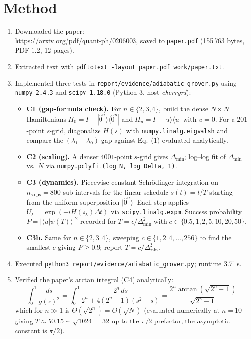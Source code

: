 \documentclass[11pt]{article}
\begin{document}
\section{Method}
\begin{enumerate}
\item Downloaded the paper: \\
\url{https://arxiv.org/pdf/quant-ph/0206003}, saved to \texttt{paper.pdf}
(155\,763 bytes, PDF 1.2, 12 pages).
\item Extracted text with \verb|pdftotext -layout paper.pdf work/paper.txt|.
\item Implemented three tests in
\texttt{report/evidence/adiabatic\_grover.py} using
\texttt{numpy 2.4.3} and \texttt{scipy 1.18.0} (Python 3, host \emph{cherryrd}):
\begin{itemize}
\item {\bf C1 (gap-formula check).} For $n \in \{2,3,4\}$, build the dense
$N\times N$ Hamiltonians $H_0 = I - |\hat 0^n\rangle\langle \hat 0^n|$ and
$H_u = I - |u\rangle\langle u|$ with $u=0$. For a $201$-point $s$-grid,
diagonalize $H(s)$ with \texttt{numpy.linalg.eigvalsh} and compare the
$(\lambda_1 - \lambda_0)$ gap against Eq.~(1) evaluated analytically.
\item {\bf C2 (scaling).} A denser $4001$-point $s$-grid gives
$\Delta_{\min}$; log--log fit of $\Delta_{\min}$ vs.\ $N$ via
\texttt{numpy.polyfit(log N, log Delta, 1)}.
\item {\bf C3 (dynamics).} Piecewise-constant Schr\"odinger integration on
$n_{\mathrm{steps}}=800$ sub-intervals for the linear schedule $s(t)=t/T$
starting from the uniform superposition
$|\hat 0^n\rangle$. Each step applies
$U_k = \exp(-i H(s_k) \Delta t)$ via \texttt{scipy.linalg.expm}.
Success probability $P = |\langle u|\psi(T)\rangle|^2$ recorded for
$T = c/\Delta_{\min}^2$ with $c \in \{0.5,1,2,5,10,20,50\}$.
\item {\bf C3b.} Same for $n \in \{2,3,4\}$, sweeping $c \in \{1,2,4,\dots,256\}$
to find the smallest $c$ giving $P \ge 0.9$; report $T = c/\Delta_{\min}^2$.
\end{itemize}
\item Executed
\verb|python3 report/evidence/adiabatic_grover.py|; runtime 3.71\,s.
\item Verified the paper's arctan integral (C4) analytically:
\[
\int_0^1 \frac{ds}{g(s)^2} = \int_0^1 \frac{2^n\,ds}{2^n + 4(2^n-1)(s^2-s)}
    = \frac{2^n \arctan(\sqrt{2^n-1})}{\sqrt{2^n - 1}}
\]
which for $n \gg 1$ is $\Theta(\sqrt{2^n}) = O(\sqrt{N})$
(evaluated numerically at $n{=}10$ giving $T \approx 50.15 \sim \sqrt{1024}=32$
up to the $\pi/2$ prefactor; the asymptotic constant is $\pi/2$).
\end{enumerate}
\end{document}
